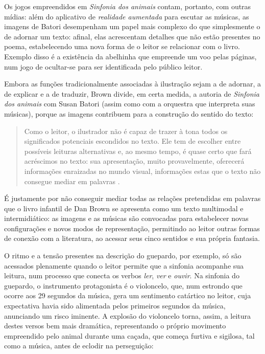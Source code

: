 \documentclass[portuguese]{textolivre}
\begin{document}
Os jogos empreendidos em \textit{Sinfonia dos animais} contam, portanto, com
outras mídias: além do aplicativo de \textit{realidade aumentada} para escutar
as músicas, as imagens de Batori desempenham um papel mais complexo do que
simplesmente o de adornar um texto: afinal, elas acrescentam detalhes que não
estão presentes no poema, estabelecendo uma nova forma de o leitor se
relacionar com o livro. Exemplo disso é a existência da abelhinha que empreende
um voo pelas páginas, num jogo de ocultar-se para ser identificada pelo público
leitor.

Embora as funções tradicionalmente associadas à ilustração sejam a de adornar,
a de explicar e a de traduzir, Brown divide, em certa medida, a autoria de
\textit{Sinfonia dos animais} com Susan Batori (assim como com a orquestra que
interpreta suas músicas), porque as imagens contribuem para a construção do
sentido do texto:

\begin{quote}
Como o leitor, o ilustrador não é capaz de trazer à tona todos os significados
potenciais escondidos no texto. Ele tem de escolher entre possíveis leituras
alternativas e, ao mesmo tempo, é quase certo que fará acréscimos no texto: sua
apresentação, muito provavelmente, oferecerá informações enraizadas no mundo
visual, informações estas que o texto não consegue mediar em palavras
\cite[p.~177]{lund_historia_2012}.
\end{quote}

É justamente por não conseguir mediar todas as relações pretendidas em palavras
que o livro infantil de Dan Brown se apresenta como um texto multimodal e
intermidiático: as imagens e as músicas são convocadas para estabelecer novas
configurações e novos modos de representação, permitindo ao leitor outras
formas de conexão com a literatura, ao acessar seus cinco sentidos e sua
própria fantasia.

O ritmo e a tensão presentes na descrição do guepardo, por exemplo, só são
acessados plenamente quando o leitor permite que a sinfonia acompanhe sua
leitura, num processo que conecta os verbos \textit{ler}, \textit{ver} e
\textit{ouvir}. Na sinfonia do guepardo, o instrumento protagonista é o
violoncelo, que, num estrondo que ocorre aos 29 segundos da música, gera um
sentimento catártico no leitor, cuja expectativa havia sido alimentada pelos
primeiros segundos da música, anunciando um risco iminente. A explosão do
violoncelo torna, assim, a leitura destes versos bem mais dramática,
representando o próprio movimento empreendido pelo animal durante uma caçada,
que começa furtiva e sigilosa, tal como a música, antes de eclodir na
perseguição:
\end{document}
